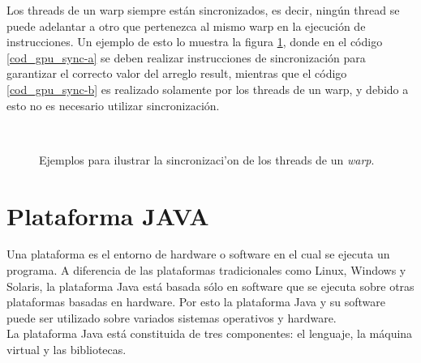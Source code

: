Los threads de un warp siempre están sincronizados, es decir, ningún thread se puede adelantar a otro que pertenezca al mismo warp en la ejecución de instrucciones. Un ejemplo de esto lo muestra la figura \ref{cod_gpu_sync}, donde en el código \ref{cod_gpu_sync-a} se deben realizar instrucciones de sincronización para garantizar el correcto valor del arreglo result, mientras que el código \ref{cod_gpu_sync-b} es realizado solamente por los threads de un warp, y debido a esto no es necesario utilizar sincronización.


\begin{figure}
\begin{center}
~~~~~~~~~~~~
\caption{\label{cod_gpu_sync}Ejemplos para ilustrar la sincronizaci'on
de los threads de un \emph{warp}.}
\end{center}
\end{figure}

\section{Plataforma JAVA}

Una plataforma es el entorno de hardware o software en el cual se ejecuta un programa. A diferencia de las plataformas tradicionales como Linux, Windows y Solaris, la plataforma Java está basada sólo en software que se ejecuta sobre otras plataformas basadas en hardware. Por esto la plataforma Java y su software puede ser utilizado sobre variados sistemas operativos y hardware. 
\\La plataforma Java está constituida de tres componentes: el lenguaje, la máquina virtual
y las bibliotecas. \cite[pág. 5]{nunez2003investigacion}

